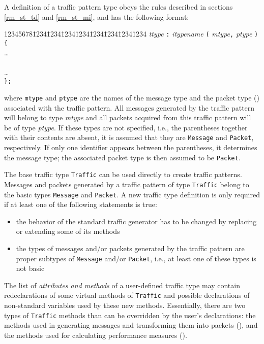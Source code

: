 A definition of a traffic pattern type obeys the rules described in
sections \ref{rm_st_td} and \ref{rm_st_mi}, and has the following format:
{\tt\begin{tabbing}
12345678\=1234\=1234\=1234\=1234\=1234\=1234\=1234\=1234\kill
{} {\em ttype\/} {\tt :} {\em itypename\/} {\tt (} {\em mtype}{\tt ,} {\em ptype\/} {\tt ) \{} \\
\> \>\ldots \\
\>  \\
\> \>\ldots \\
\> {\tt \};}
\end{tabbing}}
\noindent
where {\tt mtype} and {\tt ptype} are the names of the message type
and the packet type
() associated with the traffic pattern.
All messages generated by the traffic pattern will belong to type
{\em mtype\/} and
all packets acquired from this traffic pattern will be of type {\em ptype}.
If these types are not specified, i.e., the parentheses together with their
contents are absent, it is assumed that they are {\tt Message} and 
{\tt Packet}, respectively.
If only one identifier appears between the parentheses, it determines the
message type; the associated packet type is then assumed to be {\tt Packet}.

The base traffic type {\tt Traffic} can be used directly to create
traffic patterns.
Messages and packets generated by a traffic pattern of type {\tt Traffic}
belong to the basic types {\tt Message} and {\tt Packet}.
A new traffic type definition is only required if at least one of the
following statements is true:
\begin{itemize}
\item
the behavior of the standard traffic generator has to be changed by replacing
or extending some of its methods
\item
the types of messages and/or packets generated by the traffic pattern are proper
subtypes of {\tt Message} and/or {\tt Packet}, i.e., at least
one of these types is not basic
\end{itemize}

The list of {\em attributes and methods\/} of a user-defined traffic type
may contain redeclarations of
some virtual methods of {\tt Traffic} and possible declarations
of non-standard variables used by these new methods.
Essentially, there are two types of {\tt Traffic} methods than can be
overridden by the user's declarations: the methods used in generating messages
and transforming them into packets (),
and the methods used for calculating performance measures ().

